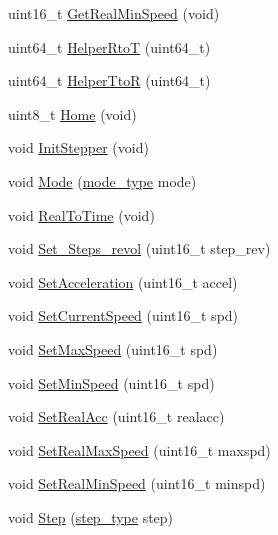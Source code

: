 \begin{DoxyCompactItemize}
\item 
uint16\-\_\-t \hyperlink{group__biba__drv_ga6fdcb3b4ad128890ee607c75a92e63a8}{Get\-Real\-Min\-Speed} (void)
\item 
uint64\-\_\-t \hyperlink{group__biba__drv_ga8f3808b2e4aa3b2a8f6467a2aaa31995}{Helper\-Rto\-T} (uint64\-\_\-t)
\item 
uint64\-\_\-t \hyperlink{group__biba__drv_gabc1e78364b977fdff7ae3b642e720f58}{Helper\-Tto\-R} (uint64\-\_\-t)
\item 
uint8\-\_\-t \hyperlink{group__biba__drv_gaf24afdf808aa610fe7471985b03ea134}{Home} (void)
\item 
void \hyperlink{group__biba__drv_gad7c735bb7a3e49bba5cb72962f045d10}{Init\-Stepper} (void)
\item 
void \hyperlink{group__biba__drv_gafe73070875f7ba05536a1eeb83258c91}{Mode} (\hyperlink{group__biba__drv_ga19269c193c0c4866cdc4e5abd433f9fc}{mode\-\_\-type} mode)
\item 
void \hyperlink{group__biba__drv_gad23127bea36c997c0b1c767f2421db6a}{Real\-To\-Time} (void)
\item 
void \hyperlink{group__biba__drv_ga0c630286eeb4f2b49bfe96670dafd65c}{Set\-\_\-\-Steps\-\_\-revol} (uint16\-\_\-t step\-\_\-rev)
\item 
void \hyperlink{group__biba__drv_ga746cb11e60c877a82b3ecbdbaa375f5e}{Set\-Acceleration} (uint16\-\_\-t accel)
\item 
void \hyperlink{group__biba__drv_ga91f64f1e8f2b67bfcf24f6d2a2249373}{Set\-Current\-Speed} (uint16\-\_\-t spd)
\item 
void \hyperlink{group__biba__drv_gaf56c9e829e6f40a75e89bd16f5051c63}{Set\-Max\-Speed} (uint16\-\_\-t spd)
\item 
void \hyperlink{group__biba__drv_ga39d145b6dc7b1fa19582960613440fd4}{Set\-Min\-Speed} (uint16\-\_\-t spd)
\item 
void \hyperlink{group__biba__drv_gaf272b22659980a7a5b9be13378963f67}{Set\-Real\-Acc} (uint16\-\_\-t realacc)
\item 
void \hyperlink{group__biba__drv_ga544f7d7cdcd1fc93afaaa833d1086654}{Set\-Real\-Max\-Speed} (uint16\-\_\-t maxspd)
\item 
void \hyperlink{group__biba__drv_gaf589e1659ecdbe47a83571e1368dc0e2}{Set\-Real\-Min\-Speed} (uint16\-\_\-t minspd)
\item 
void \hyperlink{group__biba__drv_ga7920069eba0a349a19a7e5af32321ad8}{Step} (\hyperlink{group__biba__drv_ga3af682b92aa259509aea217f6dc64356}{step\-\_\-type} step)
\item 

\end{DoxyCompactItemize}
